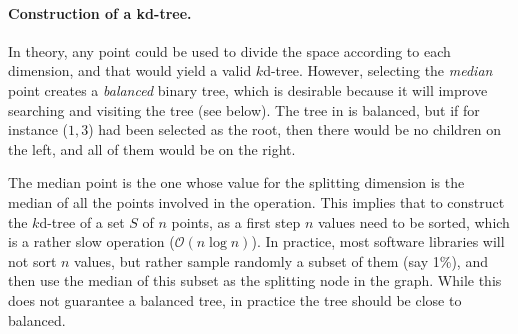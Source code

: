 \paragraph{Construction of a kd-tree.}
In theory, any point could be used to divide the space according to each dimension, and that would yield a valid $k$d-tree.
However, selecting the \emph{median} point creates a \emph{balanced} binary tree,%
which is desirable because it will improve searching and visiting the tree (see below).
The tree in  is balanced, but if for instance ($1,3$) had been selected as the root, then there would be no children on the left, and all of them would be on the right.

The median point is the one whose value for the splitting dimension is the median of all the points involved in the operation.
This implies that to construct the $k$d-tree of a set $S$ of $n$ points, as a first step $n$ values need to be sorted, which is a rather slow operation ($\mathcal{O}(n \log n)$).
In practice, most software libraries will not sort $n$ values, but rather sample randomly a subset of them (say 1\%), and then use the median of this subset as the splitting node in the graph.
While this does not guarantee a balanced tree, in practice the tree should be close to balanced.

